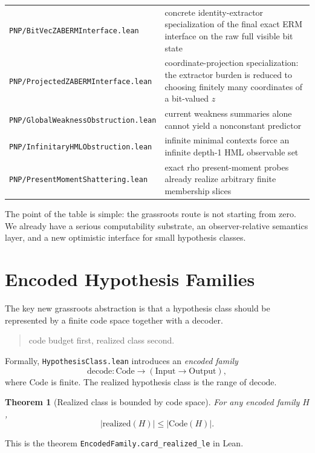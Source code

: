 \documentclass[11pt]{article}
\newtheorem{theorem}{Theorem}[section]
\theoremstyle{remark}
\begin{document}
\begin{center}
\begin{tabular}{ll}
\texttt{PNP/BitVecZABERMInterface.lean} & concrete identity-extractor specialization of the final exact ERM interface on the raw full visible bit state \\
\texttt{PNP/ProjectedZABERMInterface.lean} & coordinate-projection specialization: the extractor burden is reduced to choosing finitely many coordinates of a bit-valued $z$ \\
\texttt{PNP/GlobalWeaknessObstruction.lean} & current weakness summaries alone cannot yield a nonconstant predictor \\
\texttt{PNP/InfinitaryHMLObstruction.lean} & infinite minimal contexts force an infinite depth-1 HML observable set \\
\texttt{PNP/PresentMomentShattering.lean} & exact rho present-moment probes already realize arbitrary finite membership slices \\
\bottomrule
\end{tabular}
\end{center}

The point of the table is simple: the grassroots route is not starting from zero.
We already have a serious computability substrate, an observer-relative semantics
layer, and a new optimistic interface for small hypothesis classes.

\section{Encoded Hypothesis Families}

The key new grassroots abstraction is that a hypothesis class should be represented
by a finite code space together with a decoder.

\begin{quote}
code budget first, realized class second.
\end{quote}

Formally, \texttt{HypothesisClass.lean} introduces an \emph{encoded family}
\[
  \mathrm{decode} : \mathrm{Code} \to (\mathrm{Input} \to \mathrm{Output}),
\]
where \(\mathrm{Code}\) is finite.  The realized hypothesis class is the range of
\(\mathrm{decode}\).

\begin{theorem}[Realized class is bounded by code space]
For any encoded family \(H\),
\[
  |\mathrm{realized}(H)| \le |\mathrm{Code}(H)|.
\]
\end{theorem}

\noindent
This is the theorem \texttt{EncodedFamily.card\_realized\_le} in Lean.
\end{document}
